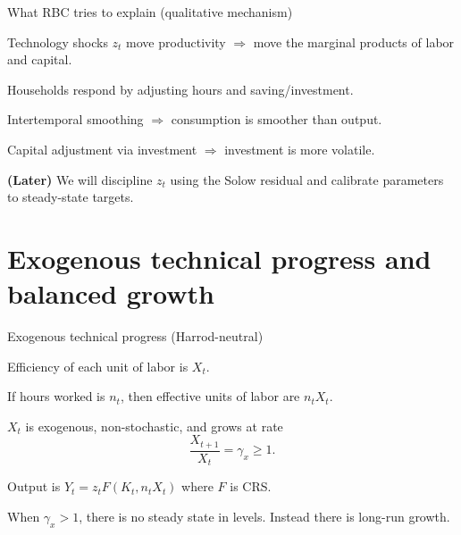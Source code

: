 \documentclass[aspectratio=169,xcolor=dvipsnames]{beamer}
\let\tempone\itemize
\let\temptwo\enditemize
\renewenvironment{itemize}{\tempone\addtolength{\itemsep}{\fill}}{\temptwo}
\providecommand{\red}[1]{\textcolor{BrickRed}{#1}}
\begin{document}
\begin{frame}{What RBC tries to explain (qualitative mechanism)}
\label{slide:BC_Mechanism}
\small
\begin{itemize}
    \item Technology shocks \(z_t\) move productivity \(\Rightarrow\) move the marginal products of labor and capital.
    \item Households respond by adjusting hours and saving/investment.
    \item Intertemporal smoothing \(\Rightarrow\) consumption is smoother than output.
    \item Capital adjustment via investment \(\Rightarrow\) investment is more volatile.
\end{itemize}

\vspace{0.4em}
\textbf{(Later)} We will discipline \(z_t\) using the Solow residual and calibrate parameters to steady-state targets.
\end{frame}

\section[BGP]{Exogenous technical progress and balanced growth}

\begin{frame}{Exogenous technical progress (Harrod-neutral)}
\label{slide:BC_TechProgress}
\small
\begin{itemize}
    \item Efficiency of each unit of labor is \(X_t\).
    \begin{itemize}
        \item If hours worked is \(n_t\), then effective units of labor are \(n_t X_t\).
    \end{itemize}
    \item \(X_t\) is exogenous, non-stochastic, and grows at rate
    \[
        \frac{X_{t+1}}{X_t}=\gamma_x \ge 1.
    \]
    \item Output is \(Y_t = z_t F(K_t,n_t X_t)\) where \(F\) is CRS.
    \item When \(\gamma_x>1\), there is \red{no steady state in levels}. Instead there is long-run growth.
\end{itemize}
\end{frame}
\end{document}
